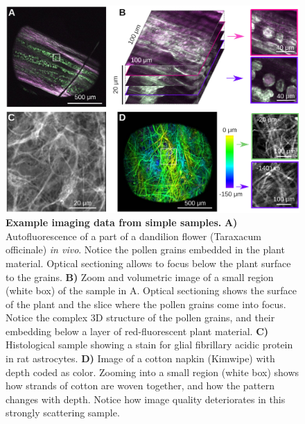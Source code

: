 \documentclass[10pt,letterpaper]{article}
\begin{document}
\begin{figure}[!t]
    \includegraphics[width=\textwidth]{fig6.jpg}
    \caption{{\bf Example imaging data from simple samples.} \textbf{A)} Autofluorescence of a part of a dandilion flower (Taraxacum officinale) \textit{in vivo}. Notice the pollen grains embedded in the plant material. Optical sectioning allows to focus below the plant surface to the grains. \textbf{B)} Zoom and volumetric image of  a small region (white box) of the sample in A. Optical sectioning shows the surface of the plant and the slice where the pollen grains come into focus. Notice the complex 3D structure of the pollen grains, and their embedding below a layer of red-fluorescent plant material. \textbf{C)} Histological sample showing a stain for glial fibrillary acidic protein in rat astrocytes. \textbf{D)} Image of a cotton napkin (Kimwipe) with depth coded as color. Zooming into a small region (white box) shows how strands of cotton are woven together, and how the pattern changes with depth. Notice how image quality deteriorates in this strongly scattering sample.}
    \label{fig6}
\end{figure}
\end{document}

